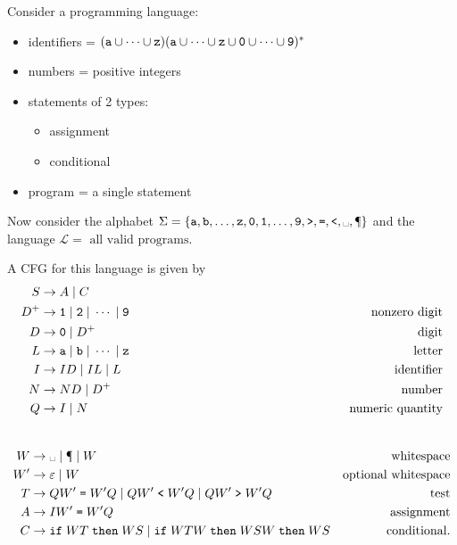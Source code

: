 \documentclass{notes}
\begin{document}
\begin{eg}
  Consider a programming language: 
  \begin{itemize}
    \item identifiers = $(\verb~a~ \cup \cdots \cup \verb~z~) (\verb~a~ \cup \cdots \cup \verb~z~ \cup \verb~0~ \cup \cdots \cup \verb~9~)^*$

    \item numbers = positive integers

    \item statements of 2 types: 

    \begin{itemize}
      \item assignment

      \item conditional
    \end{itemize}
    
    \item program = a single statement
  \end{itemize}
  
  Now consider the alphabet $\Sigma = \left \{ \verb~a~, \verb~b~, \dots, \verb~z~, \verb~0~, \verb~1~, \dots, \verb~9~, \verb~>~, \verb~=~, \verb~<~, \text{\textvisiblespace}, \verb~¶~ \right \}$ and the language $\mathcal L = \text{ all valid programs}$.
  
  A CFG for this language is given by 
  \begin{align*}
    S &\to A \; | \; C \\ 
    D^+ &\to  \verb~1~ \; | \; \verb~2~ \; | \; \cdots \; | \; \verb~9~ & \text{nonzero digit} \\
    D &\to \verb~0~ \; | \; D^+ & \text{digit} \\ 
    L &\to \verb~a~ \; | \; \verb~b~ \; | \; \cdots \; | \; \verb~z~ & \text{letter} \\ 
    I &\to I D \; | \; I L \; | \; L & \text{identifier} \\ 
    N &\to N D \; | \; D^+ & \text{number} \\ 
    Q &\to I \; | \; N & \text{numeric quantity} \\ 
    \phantom{C} &\phantom{\to \verb~if~ \; W T \; \verb~then~ \; W S \; | \; \verb~if~ \; W T W \; \verb~then~ \; W S W \; \verb~then~ \; W S} & \phantom{\text{conditional}.}
  \end{align*}
  
  \begin{align*}
    W &\to \text{\textvisiblespace} \; | \; \verb~¶~ \; | \; W & \text{whitespace} \\ 
    W' &\to \varepsilon \; | \; W & \text{optional whitespace} \\ 
    T &\to Q W' \; \verb~=~ \; W' Q \; | \; Q W' \; \verb~<~ \; W' Q \; | \; Q W' \; \verb~>~ \; W' Q & \text{test} \\ 
    A &\to I W' \; \verb~=~ \; W' Q & \text{assignment} \\ 
    C &\to \verb~if~ \; W T \; \verb~then~ \; W S \; | \; \verb~if~ \; W T W \; \verb~then~ \; W S W \; \verb~then~ \; W S & \text{conditional}.
  \end{align*}
\end{eg}
\end{document}
